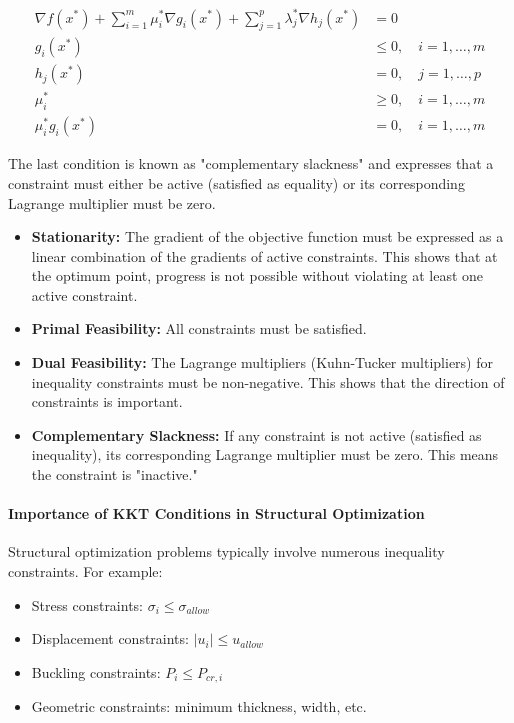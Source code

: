 \begin{equation}
\begin{aligned}
\nabla f(x^*) + \sum_{i=1}^m \mu_i^* \nabla g_i(x^*) + \sum_{j=1}^p \lambda_j^* \nabla h_j(x^*) &= 0 \\
g_i(x^*) &\leq 0, \quad i = 1, \ldots, m \\
h_j(x^*) &= 0, \quad j = 1, \ldots, p \\
\mu_i^* &\geq 0, \quad i = 1, \ldots, m \\
\mu_i^* g_i(x^*) &= 0, \quad i = 1, \ldots, m
\end{aligned}
\end{equation}

The last condition is known as "complementary slackness" and expresses that a constraint must either be active (satisfied as equality) or its corresponding Lagrange multiplier must be zero.

\begin{tcolorbox}[title=Interpretation of KKT Conditions]
\begin{itemize}
    \item \textbf{Stationarity:} The gradient of the objective function must be expressed as a linear combination of the gradients of active constraints. This shows that at the optimum point, progress is not possible without violating at least one active constraint.
    
    \item \textbf{Primal Feasibility:} All constraints must be satisfied.
    
    \item \textbf{Dual Feasibility:} The Lagrange multipliers (Kuhn-Tucker multipliers) for inequality constraints must be non-negative. This shows that the direction of constraints is important.
    
    \item \textbf{Complementary Slackness:} If any constraint is not active (satisfied as inequality), its corresponding Lagrange multiplier must be zero. This means the constraint is "inactive."
\end{itemize}
\end{tcolorbox}

\paragraph{Importance of KKT Conditions in Structural Optimization}
Structural optimization problems typically involve numerous inequality constraints. For example:
\begin{itemize}
    \item Stress constraints: $\sigma_i \leq \sigma_{allow}$
    \item Displacement constraints: $|u_i| \leq u_{allow}$
    \item Buckling constraints: $P_i \leq P_{cr,i}$
    \item Geometric constraints: minimum thickness, width, etc.
\end{itemize}

